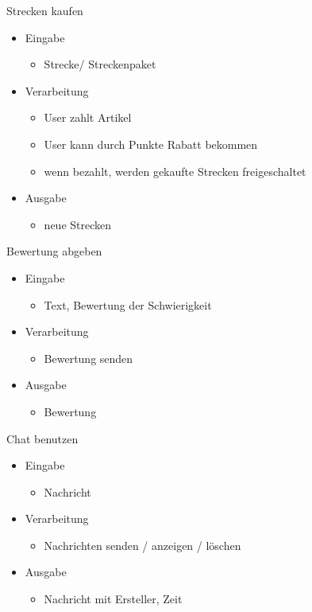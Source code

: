 \documentclass[a4paper, 12pp]{article}
\begin{document}
\bigskip
{\Large Strecken kaufen}\\
\begin{itemize}
\item Eingabe
	\begin{itemize}
	\item Strecke/ Streckenpaket
	\end{itemize}
\item Verarbeitung
	\begin{itemize}
	\item User zahlt Artikel
	\item User kann durch Punkte Rabatt bekommen
	\item wenn bezahlt, werden gekaufte Strecken freigeschaltet
	\end{itemize}
\item Ausgabe
	\begin{itemize}
	\item neue Strecken
	\end{itemize}
\end{itemize}

\bigskip
{\Large Bewertung abgeben}\\
\begin{itemize}
\item Eingabe
	\begin{itemize}
	\item Text, Bewertung der Schwierigkeit
	\end{itemize}
\item Verarbeitung
	\begin{itemize}
	\item Bewertung senden
	\end{itemize}
\item Ausgabe
	\begin{itemize}
	\item Bewertung
	\end{itemize}
\end{itemize}

\bigskip
{\Large Chat benutzen}\\
\begin{itemize}
\item Eingabe
	\begin{itemize}
	\item Nachricht
	\end{itemize}
\item Verarbeitung
	\begin{itemize}
	\item Nachrichten senden / anzeigen / löschen
	\end{itemize}
\item Ausgabe
	\begin{itemize}
	\item Nachricht mit Ersteller, Zeit
	\end{itemize}
\end{itemize}
\end{document}

